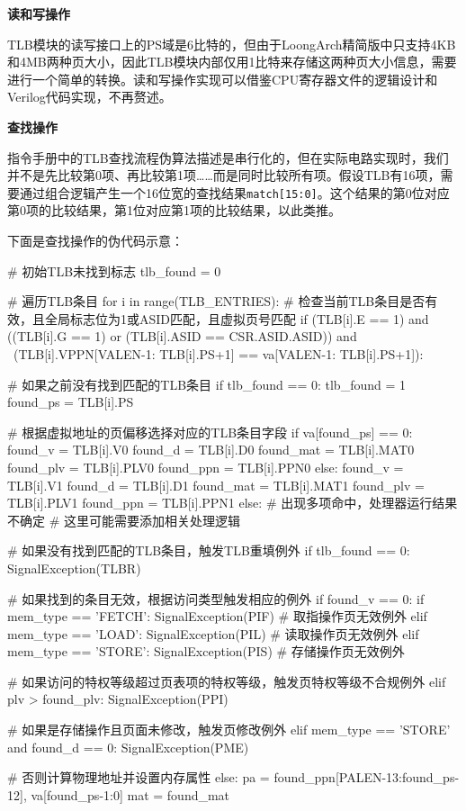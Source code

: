 \textbf{读和写操作}

TLB模块的读写接口上的PS域是6比特的，但由于LoongArch精简版中只支持4KB和4MB两种页大小，因此TLB模块内部仅用1比特来存储这两种页大小信息，需要进行一个简单的转换。读和写操作实现可以借鉴CPU寄存器文件的逻辑设计和Verilog代码实现，不再赘述。

\textbf{查找操作}

指令手册中的TLB查找流程伪算法描述是串行化的，但在实际电路实现时，我们并不是先比较第0项、再比较第1项\ldots\ldots 而是同时比较所有项。假设TLB有16项，需要通过组合逻辑产生一个16位宽的查找结果\texttt{match{[}15:0{]}}。这个结果的第0位对应第0项的比较结果，第1位对应第1项的比较结果，以此类推。

下面是查找操作的伪代码示意：

\begin{CodeBlock}[language=BookPseudo]
# 初始TLB未找到标志
tlb_found = 0

# 遍历TLB条目
for i in range(TLB_ENTRIES):
    # 检查当前TLB条目是否有效，且全局标志位为1或ASID匹配，且虚拟页号匹配
    if (TLB[i].E == 1) and ((TLB[i].G == 1) or (TLB[i].ASID == CSR.ASID.ASID)) and \
       (TLB[i].VPPN[VALEN-1: TLB[i].PS+1] == va[VALEN-1: TLB[i].PS+1]):
        
        # 如果之前没有找到匹配的TLB条目
        if tlb_found == 0:
            tlb_found = 1
            found_ps = TLB[i].PS

            # 根据虚拟地址的页偏移选择对应的TLB条目字段
            if va[found_ps] == 0:
                found_v = TLB[i].V0
                found_d = TLB[i].D0
                found_mat = TLB[i].MAT0
                found_plv = TLB[i].PLV0
                found_ppn = TLB[i].PPN0
            else:
                found_v = TLB[i].V1
                found_d = TLB[i].D1
                found_mat = TLB[i].MAT1
                found_plv = TLB[i].PLV1
                found_ppn = TLB[i].PPN1
        else:
            # 出现多项命中，处理器运行结果不确定
            # 这里可能需要添加相关处理逻辑

# 如果没有找到匹配的TLB条目，触发TLB重填例外
if tlb_found == 0:
    SignalException(TLBR)

# 如果找到的条目无效，根据访问类型触发相应的例外
if found_v == 0:
    if mem_type == 'FETCH':
        SignalException(PIF)  # 取指操作页无效例外
    elif mem_type == 'LOAD':
        SignalException(PIL)  # 读取操作页无效例外
    elif mem_type == 'STORE':
        SignalException(PIS)  # 存储操作页无效例外

# 如果访问的特权等级超过页表项的特权等级，触发页特权等级不合规例外
elif plv > found_plv:
    SignalException(PPI)

# 如果是存储操作且页面未修改，触发页修改例外
elif mem_type == 'STORE' and found_d == 0:
    SignalException(PME)

# 否则计算物理地址并设置内存属性
else:
    pa = {found_ppn[PALEN-13:found_ps-12], va[found_ps-1:0]}
    mat = found_mat

\end{CodeBlock}

